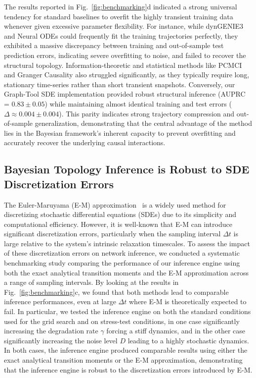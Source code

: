\documentclass[10pt, aps, rmp,  twocolumn, superscriptaddress, floatfix, showkeys]{revtex4-2}
\begin{document}
The results reported in Fig.~\ref{fig:benchmarking}d indicated a strong universal tendency for standard baselines to overfit the highly transient training data whenever given excessive parameter flexibility. For instance, while dynGENIE3 and Neural ODEs could frequently fit the training trajectories perfectly, they exhibited a massive discrepancy between training and out-of-sample test prediction errors, indicating severe overfitting to noise, and failed to recover the structural topology. Information-theoretic and statistical methods like PCMCI and Granger Causality also struggled significantly, as they typically require long, stationary time-series rather than short transient snapshots. Conversely, our Graph-Tool SDE implementation provided robust structural inference (AUPRC = $0.83\pm0.05$) while maintaining almost identical training and test errors ($\Delta \approx 0.004\pm0.004$). This parity indicates strong trajectory compression and out-of-sample generalization, demonstrating that the central advantage of the method lies in the Bayesian framework's inherent capacity to prevent overfitting and accurately recover the underlying causal interactions.

\subsection{Bayesian Topology Inference is Robust to SDE Discretization Errors}


The Euler-Maruyama (E-M) approximation~\cite{kloeden1992numerical} is a widely used method for discretizing stochastic differential equations (SDEs) due to its simplicity and computational efficiency. However, it is well-known that E-M can introduce significant discretization errors, particularly when the sampling interval $\Delta t$ is large relative to the system's intrinsic relaxation timescales.
To assess the impact of these discretization errors on network inference, we conducted a systematic benchmarking study comparing the performance of our inference engine using both the exact analytical transition moments and the E-M approximation across a range of sampling intervals.
By looking at the results in Fig.~\ref{fig:benchmarking}c, we found that both methods lead to comparable inference performances, even at large $\Delta t$ where E-M is theoretically expected to fail. In particular, we tested the inference engine on both the standard conditions used for the grid search and on stress-test conditions, in one case significantly increasing the degradation rate $\gamma$ forcing a stiff dynamics, and in the other case significantly increasing the noise level $D$ leading to a highly stochastic dynamics. In both cases, the inference engine produced comparable results using either the exact analytical transition moments or the E-M approximation, demonstrating that the inference engine is robust to the discretization errors introduced by E-M.
\end{document}
